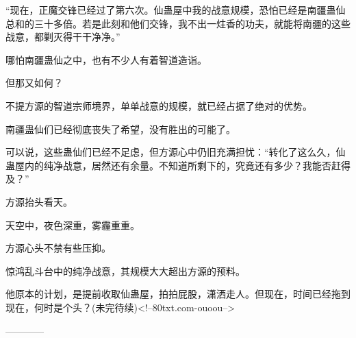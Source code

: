 \begin{this_body}
“现在，正魔交锋已经过了第六次。仙蛊屋中我的战意规模，恐怕已经是南疆蛊仙总和的三十多倍。若是此刻和他们交锋，我不出一炷香的功夫，就能将南疆的这些战意，都剿灭得干干净净。”

哪怕南疆蛊仙之中，也有不少人有着智道造诣。

但那又如何？

不提方源的智道宗师境界，单单战意的规模，就已经占据了绝对的优势。

南疆蛊仙们已经彻底丧失了希望，没有胜出的可能了。

可以说，这些蛊仙们已经不足虑，但方源心中仍旧充满担忧：“转化了这么久，仙蛊屋内的纯净战意，居然还有余量。不知道所剩下的，究竟还有多少？我能否赶得及？”

方源抬头看天。

天空中，夜色深重，雾霾重重。

方源心头不禁有些压抑。

惊鸿乱斗台中的纯净战意，其规模大大超出方源的预料。

他原本的计划，是提前收取仙蛊屋，拍拍屁股，潇洒走人。但现在，时间已经拖到现在，何时是个头？(未完待续)<!--80txt.com-ouoou-->

------------

\end{this_body}

